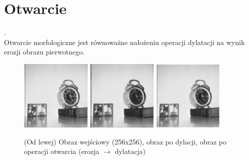 \documentclass[final,a4paper,openany,12pt]{mwbk}
\begin{document}
\section{ Otwarcie}
.\hfill\\
\indent
	Otwarcie morfologiczne jest równoważne nałożeniu operacji dylatacji na wynik erozji obrazu pierwotnego.

\begin{figure}[H]
	\begin{center}
		\includegraphics[width=0.3\textwidth]{1/1Gray_Op_Original}
		\includegraphics[width=0.3\textwidth]{1/1Gray_Op_E_Result}
		\includegraphics[width=0.3\textwidth]{1/1Gray_Op_ED_Result}
	\end{center}
	\caption{(Od lewej) Obraz wejściowy (256x256), obraz po dylacji, obraz po operacji otwarcia (erozja $\rightarrow$ dylatacja)}
\end{figure}
\end{document}
